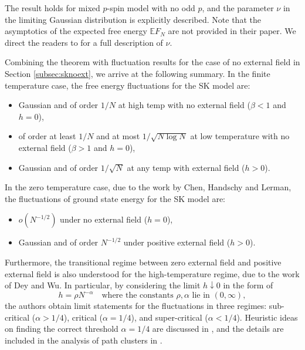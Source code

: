 \documentclass[11pt]{article}
\numberwithin{equation}{section}
\def \a {\alpha}
\def \b {\beta}
\newcommand{\bE}{\mathbb{E}}
\theoremstyle{remark}
\begin{document}
The result holds for mixed $p$-spin model with no odd $p$, and the parameter $\nu$ in the limiting Gaussian distribution is explicitly described. Note that the asymptotics of the expected free energy $\bE F_N$ are not provided in their paper. We direct the readers to \cite{ChenDeyPanchenko} for a full description of $\nu$. 

Combining the theorem with fluctuation results for the case of no external field in Section \ref{subsec:sknoext}, we arrive at the following summary. In the finite temperature case, the free energy fluctuations for the SK model are:
\begin{itemize}
    \item Gaussian and of order $1/N$ at high temp with no external field ($\b<1$ and $h=0$), 
    \item of order at least $1/N$ and at most $1/\sqrt{N \log N}$ at low temperature with no external field ($\b>1$ and $h=0$),
    \item Gaussian and of order $1/\sqrt{N}$ at any temp with external field ($h>0$). 
\end{itemize}

In the zero temperature case, due to the work \cite{ChenHandschyLerman2018} by Chen, Handschy and Lerman, the fluctuations of ground state energy for the SK model are:
\begin{itemize}
    \item $o(N^{-1/2})$ under no external field ($h=0$),
    \item Gaussian and of order $N^{-1/2}$ under positive external field ($h>0$).
\end{itemize}

Furthermore, the transitional regime between zero external field and positive external field is also understood for the high-temperature regime, due to the work \cite{DeyWu23} of Dey and Wu. In particular, by considering the limit $h\downarrow 0$ in the form of
\[
h = \rho N^{-\a} \quad \text{where the constants $\rho, \a$ lie in }(0,\infty),
\]
the authors obtain limit statements for the fluctuations in three regimes: sub-critical ($\a>1/4$), critical ($\a=1/4$), and super-critical ($\a<1/4$). Heuristic ideas on finding the correct threshold $\a=1/4$ are discussed in \cite[Section 1.3]{DeyWu23}, and the details are included in the analysis of path clusters in \cite[Section 5.2]{DeyWu23}. 
\end{document}
